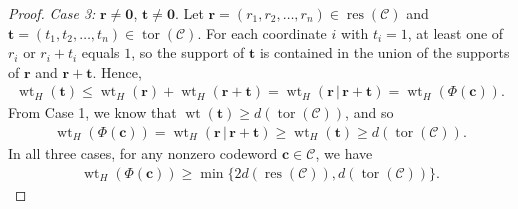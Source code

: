 \documentclass[12pt]{article}
\theoremstyle{definition}
\theoremstyle{plain}
\begin{document}
\begin{proof}
\noindent\emph{Case 3:}  $ \mathbf{r} \neq \mathbf{0}$, $ \mathbf{t} \neq \mathbf{0}$.
Let $ \mathbf{r}  =  (r_1 ,r_2 , \dotsc , r_n ) \in \operatorname{res} (\mathcal{C}) $ and $ \mathbf{t} = ( t_1 , t_2 , \dotsc , t_n ) \in \operatorname{tor} (\mathcal{C}) $. For each coordinate $i$ with $t_i = 1$, at least one of $r_i$ or $r_i + t_i$ equals $1$, so the support of $ \mathbf{t} $ is contained in the union of the supports of $ \mathbf{r} $ and $ \mathbf{r}  +  \mathbf{t} $. Hence,
\begin{align*}
\operatorname{wt}_H ( \mathbf{t} )   \le   \operatorname{wt}_H ( \mathbf{r} ) + \operatorname{wt}_H ( \mathbf{r}  + \mathbf{t}  ) = \operatorname{wt}_H  ( \mathbf{r} \, | \,  \mathbf{r}  + \mathbf{t}  )  =  \operatorname{wt}_H ( \Phi ( \mathbf{c} )  )  .
\end{align*}
From Case 1, we know that $\operatorname{wt} ( \mathbf{t} ) \ge d( \operatorname{tor} (\mathcal{C}) )$, and so
\begin{align*}
\operatorname{wt}_H ( \Phi ( \mathbf{c} ) ) = \operatorname{wt}_H  ( \mathbf{r} \, | \, \mathbf{r} + \mathbf{t}  ) \ge \operatorname{wt}_H ( \mathbf{t} ) \ge d ( \operatorname{tor} (\mathcal{C}) ) .
\end{align*}
In all three cases, for any nonzero codeword $ \mathbf{c}  \in  \mathcal{C}$, we have
\begin{align*}
\operatorname{wt}_H ( \Phi ( \mathbf{c} ) )  \geq  \min\{2 d(\operatorname{res}(\mathcal{C})), d(\operatorname{tor}(\mathcal{C}))\}  .
\end{align*}


\end{proof}
\end{document}
